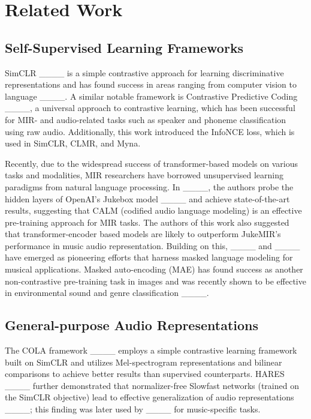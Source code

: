 \section{Related Work}

\subsection{Self-Supervised Learning Frameworks}

SimCLR ____ is a simple contrastive approach for learning discriminative representations and has found success in areas ranging from computer vision to language ____. A similar notable framework is Contrastive Predictive Coding ____, a universal approach to contrastive learning, which has been successful for MIR- and audio-related tasks such as speaker and phoneme classification using raw audio. Additionally, this work introduced the InfoNCE loss, which is used in SimCLR, CLMR, and Myna.

Recently, due to the widespread success of transformer-based models on various tasks and modalities, MIR researchers have borrowed unsupervised learning paradigms from natural language processing. In ____, the authors probe the hidden layers of OpenAI's Jukebox model ____ and achieve state-of-the-art results, suggesting that CALM (codified audio language modeling) is an effective pre-training approach for MIR tasks. The authors of this work also suggested that transformer-encoder based models are likely to outperform JukeMIR's performance in music audio representation. Building on this, ____ and ____ have emerged as pioneering efforts that harness masked language modeling for musical applications. Masked auto-encoding (MAE) has found success as another non-contrastive pre-training task in images and was recently shown to be effective in environmental sound and genre classification ____. 

\subsection{General-purpose Audio Representations}

The COLA framework ____ employs a simple contrastive learning framework built on SimCLR and utilizes Mel-spectrogram representations and bilinear comparisons to achieve better results than supervised counterparts. HARES ____ further demonstrated that normalizer-free Slowfast networks (trained on the SimCLR objective) lead to effective generalization of audio representations ____; this finding was later used by ____ for music-specific tasks.

